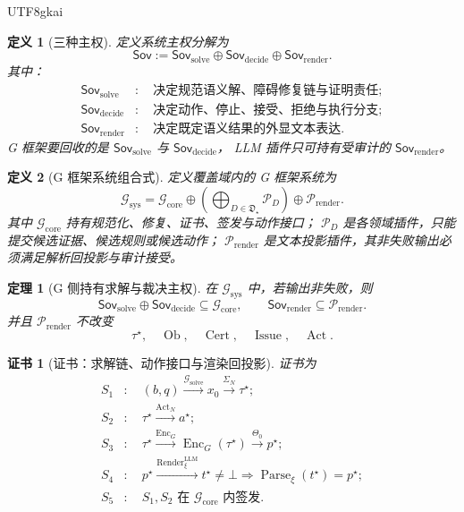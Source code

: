 \documentclass[12pt]{article}
\newtheorem{definition}{定义}[section]
\newtheorem{theorem}{定理}[section]
\newtheorem{Certificate}{证书}[section]
\newcommand{\Cert}{\operatorname{Cert}}
\newcommand{\Render}{\operatorname{Render}}
\newcommand{\Parse}{\operatorname{Parse}}
\newcommand{\Issue}{\operatorname{Issue}}
\newcommand{\Enc}{\operatorname{Enc}}
\newcommand{\Act}{\operatorname{Act}}
\newcommand{\Sov}{\mathsf{Sov}}
\begin{document}
\begin{CJK*}{UTF8}{gkai}
\begin{definition}[三种主权]
定义系统主权分解为
\[
  \Sov
  :=
  \Sov_{\mathrm{solve}}
  \oplus
  \Sov_{\mathrm{decide}}
  \oplus
  \Sov_{\mathrm{render}}.
\]
其中：
\[
\begin{aligned}
  \Sov_{\mathrm{solve}}
  &:\quad \text{决定规范语义解、障碍修复链与证明责任};\\
  \Sov_{\mathrm{decide}}
  &:\quad \text{决定动作、停止、接受、拒绝与执行分支};\\
  \Sov_{\mathrm{render}}
  &:\quad \text{决定既定语义结果的外显文本表达}.
\end{aligned}
\]
G 框架要回收的是 \(\Sov_{\mathrm{solve}}\) 与 \(\Sov_{\mathrm{decide}}\)，
LLM 插件只可持有受审计的 \(\Sov_{\mathrm{render}}\)。
\end{definition}

\begin{definition}[G 框架系统组合式]
定义覆盖域内的 G 框架系统为
\[
  \mathcal G_{\mathrm{sys}}
  =
  \mathcal G_{\mathrm{core}}
  \oplus
  \left(
    \bigoplus_{D\in\mathfrak D_\star}\mathcal P_D
  \right)
  \oplus
  \mathcal P_{\mathrm{render}}.
\]
其中 \(\mathcal G_{\mathrm{core}}\) 持有规范化、修复、证书、签发与动作接口；
\(\mathcal P_D\) 是各领域插件，只能提交候选证据、候选规则或候选动作；
\(\mathcal P_{\mathrm{render}}\) 是文本投影插件，其非失败输出必须满足解析回投影与审计接受。
\end{definition}

\begin{theorem}[G 侧持有求解与裁决主权]
\label{thm:tex51-g-sovereignty}
在 \(\mathcal G_{\mathrm{sys}}\) 中，若输出非失败，则
\[
  \Sov_{\mathrm{solve}}\oplus\Sov_{\mathrm{decide}}
  \subseteq
  \mathcal G_{\mathrm{core}},
  \qquad
  \Sov_{\mathrm{render}}
  \subseteq
  \mathcal P_{\mathrm{render}}.
\]
并且 \(\mathcal P_{\mathrm{render}}\) 不改变
\[
  \tau^\star,\quad \operatorname{Ob},\quad \Cert,\quad \Issue,\quad \Act.
\]
\end{theorem}

\begin{Certificate}[证书：求解链、动作接口与渲染回投影]
\label{cert:tex51-g-sovereignty}
证书为
\[
\begin{aligned}
  S_1&:\quad (b,q)\xrightarrow{\mathcal G_{\mathrm{solve}}}x_0
  \xrightarrow{\Sigma_N}\tau^\star;\\
  S_2&:\quad \tau^\star\xrightarrow{\Act_N}a^\star;\\
  S_3&:\quad \tau^\star\xrightarrow{\Enc_G}\Enc_G(\tau^\star)
  \xrightarrow{\Theta_0}p^\star;\\
  S_4&:\quad p^\star\xrightarrow{\Render_\xi^{\mathrm{LLM}}}t^\star\ne\bot
  \Rightarrow \Parse_\xi(t^\star)=p^\star;\\
  S_5&:\quad S_1,S_2\text{ 在 }\mathcal G_{\mathrm{core}}\text{ 内签发}.
\end{aligned}
\]
\end{Certificate}


\end{CJK*}
\end{document}
